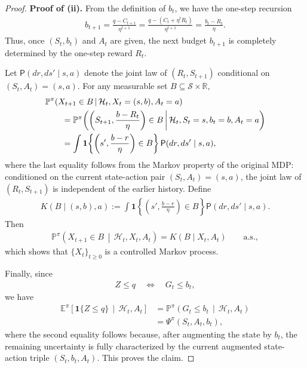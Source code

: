 \begin{proof}
\medskip
\noindent\textbf{Proof of (ii).}
From the definition of $b_t$, we have the one-step recursion
\begin{align}
    b_{t+1}
    =
    \frac{q-C_{t+1}}{\eta^{t+1}}
    =
    \frac{q-(C_t+\eta^t R_t)}{\eta^{t+1}}
    =
    \frac{b_t-R_t}{\eta}.
\end{align}
Thus, once $(S_t,b_t)$ and $A_t$ are given, the next budget $b_{t+1}$ is completely determined by the one-step reward $R_t$.

Let $\mathsf{P}(dr,ds'\mid s,a)$ denote the joint law of $(R_t,S_{t+1})$ conditional on $(S_t,A_t)=(s,a)$. For any measurable set $B\subseteq \mathcal{S}\times\mathbb{R}$,
\begin{align}
    &\mathbb{P}^{\pi}\!\left(
        X_{t+1}\in B
        \,\middle|\,
        \mathcal{H}_t,X_t=(s,b),A_t=a
    \right) \notag\\
    &\qquad =
    \mathbb{P}^{\pi}\!\left(
        \left(S_{t+1},\frac{b-R_t}{\eta}\right)\in B
        \,\middle|\,
        \mathcal{H}_t,S_t=s,b_t=b,A_t=a
    \right) \notag\\
    &\qquad =
    \int
    \mathbf{1}\!\left\{
        \left(s',\frac{b-r}{\eta}\right)\in B
    \right\}
    \mathsf{P}(dr,ds'\mid s,a),
\end{align}
where the last equality follows from the Markov property of the original MDP: conditioned on the current state-action pair $(S_t,A_t)=(s,a)$, the joint law of $(R_t,S_{t+1})$ is independent of the earlier history. Define
\begin{align}
    K(B\mid (s,b),a)
    :=
    \int
    \mathbf{1}\!\left\{
        \left(s',\frac{b-r}{\eta}\right)\in B
    \right\}
    \mathsf{P}(dr,ds'\mid s,a).
\end{align}
Then
\begin{align}
    \mathbb{P}^{\pi}\!\left(
        X_{t+1}\in B
        \,\middle|\,
        \mathcal{H}_t,X_t,A_t
    \right)
    =
    K(B\mid X_t,A_t)
    \qquad \text{a.s.},
\end{align}
which shows that $\{X_t\}_{t\ge 0}$ is a controlled Markov process.

Finally, since
\begin{align}
    Z\le q
    \quad \Longleftrightarrow \quad
    G_t\le b_t,
\end{align}
we have
\begin{align}
    \mathbb{E}^{\pi}\!\left[
        \mathbf{1}\{Z\le q\}
        \,\middle|\,
        \mathcal{H}_t,A_t
    \right]
    &=
    \mathbb{P}^{\pi}\!\left(
        G_t\le b_t
        \,\middle|\,
        \mathcal{H}_t,A_t
    \right) \\
    &=
    \Psi^{\pi}(S_t,A_t,b_t),
\end{align}
where the second equality follows because, after augmenting the state by $b_t$, the remaining uncertainty is fully characterized by the current augmented state-action triple $(S_t,b_t,A_t)$. This proves the claim.
\end{proof}







